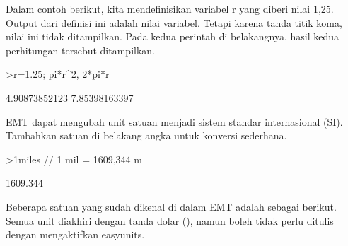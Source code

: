 \documentclass[a4paper,10pt]{article}
\begin{document}
\begin{eulernotebook}
\begin{eulercomment}
\begin{eulercomment}
\begin{eulercomment}
Dalam contoh berikut, kita mendefinisikan variabel r yang diberi nilai
1,25. Output dari definisi ini adalah nilai variabel. Tetapi karena
tanda titik koma, nilai ini tidak ditampilkan. Pada kedua perintah di
belakangnya, hasil kedua perhitungan tersebut ditampilkan.
\end{eulercomment}
\begin{eulerprompt}
>r=1.25; pi*r^2, 2*pi*r
\end{eulerprompt}
\begin{euleroutput}
  4.90873852123
  7.85398163397
\end{euleroutput}
\begin{eulercomment}
EMT dapat mengubah unit satuan menjadi sistem standar internasional
(SI). Tambahkan satuan di belakang angka untuk konversi sederhana.
\end{eulercomment}
\begin{eulerprompt}
>1miles  // 1 mil = 1609,344 m
\end{eulerprompt}
\begin{euleroutput}
  1609.344
\end{euleroutput}
\begin{eulercomment}
Beberapa satuan yang sudah dikenal di dalam EMT adalah sebagai
berikut. Semua unit diakhiri dengan tanda dolar (\textdollar{}), namun boleh tidak
perlu ditulis dengan mengaktifkan easyunits. 


\end{eulercomment}
\end{eulercomment}
\end{eulercomment}
\end{eulernotebook}
\end{document}
